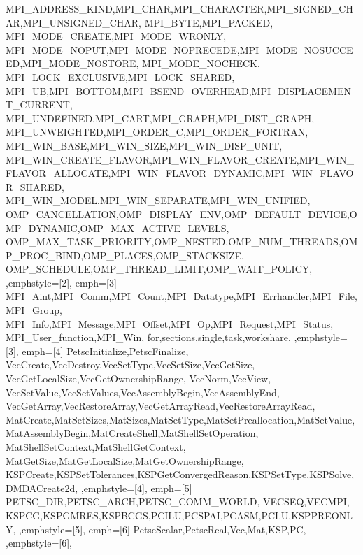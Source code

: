 {{    MPI_ADDRESS_KIND,MPI_CHAR,MPI_CHARACTER,MPI_SIGNED_CHAR,MPI_UNSIGNED_CHAR,
    MPI_BYTE,MPI_PACKED, MPI_MODE_CREATE,MPI_MODE_WRONLY,
    MPI_MODE_NOPUT,MPI_MODE_NOPRECEDE,MPI_MODE_NOSUCCEED,MPI_MODE_NOSTORE,
    MPI_MODE_NOCHECK, MPI_LOCK_EXCLUSIVE,MPI_LOCK_SHARED,
    MPI_UB,MPI_BOTTOM,MPI_BSEND_OVERHEAD,MPI_DISPLACEMENT_CURRENT,
    MPI_UNDEFINED,MPI_CART,MPI_GRAPH,MPI_DIST_GRAPH,
    MPI_UNWEIGHTED,MPI_ORDER_C,MPI_ORDER_FORTRAN,
    MPI_WIN_BASE,MPI_WIN_SIZE,MPI_WIN_DISP_UNIT,
    MPI_WIN_CREATE_FLAVOR,MPI_WIN_FLAVOR_CREATE,MPI_WIN_FLAVOR_ALLOCATE,MPI_WIN_FLAVOR_DYNAMIC,MPI_WIN_FLAVOR_SHARED,
    MPI_WIN_MODEL,MPI_WIN_SEPARATE,MPI_WIN_UNIFIED,
    OMP_CANCELLATION,OMP_DISPLAY_ENV,OMP_DEFAULT_DEVICE,OMP_DYNAMIC,OMP_MAX_ACTIVE_LEVELS,
    OMP_MAX_TASK_PRIORITY,OMP_NESTED,OMP_NUM_THREADS,OMP_PROC_BIND,OMP_PLACES,OMP_STACKSIZE,
    OMP_SCHEDULE,OMP_THREAD_LIMIT,OMP_WAIT_POLICY,
  },emphstyle={[2]\color{green!40!black}},
  emph={[3] %
    MPI_Aint,MPI_Comm,MPI_Count,MPI_Datatype,MPI_Errhandler,MPI_File,MPI_Group,
    MPI_Info,MPI_Message,MPI_Offset,MPI_Op,MPI_Request,MPI_Status,
    MPI_User_function,MPI_Win,
    for,sections,single,task,workshare,
  },emphstyle={[3]\color{brown}\bfseries},
  emph={[4] %
    PetscInitialize,PetscFinalize,
    VecCreate,VecDestroy,VecSetType,VecSetSize,VecGetSize,
    VecGetLocalSize,VecGetOwnershipRange,
    VecNorm,VecView,
    VecSetValue,VecSetValues,VecAssemblyBegin,VecAssemblyEnd,
    VecGetArray,VecRestoreArray,VecGetArrayRead,VecRestoreArrayRead,
    MatCreate,MatSetSizes,MatSizes,MatSetType,MatSetPreallocation,MatSetValue,
    MatAssemblyBegin,MatCreateShell,MatShellSetOperation,
    MatShellSetContext,MatShellGetContext,
    MatGetSize,MatGetLocalSize,MatGetOwnershipRange,
    KSPCreate,KSPSetTolerances,KSPGetConvergedReason,KSPSetType,KSPSolve,
    DMDACreate2d,
  },emphstyle={[4]\color{red!40!black}\bfseries},
  emph={[5] %
    PETSC_DIR,PETSC_ARCH,PETSC_COMM_WORLD,
    VECSEQ,VECMPI,
    KSPCG,KSPGMRES,KSPBCGS,PCILU,PCSPAI,PCASM,PCLU,KSPPREONLY,
  },emphstyle={[5]\color{green!60!black}},
  emph={[6] %
    PetscScalar,PetscReal,Vec,Mat,KSP,PC,
  },emphstyle={[6]\bfseries\color{blue}},
}
